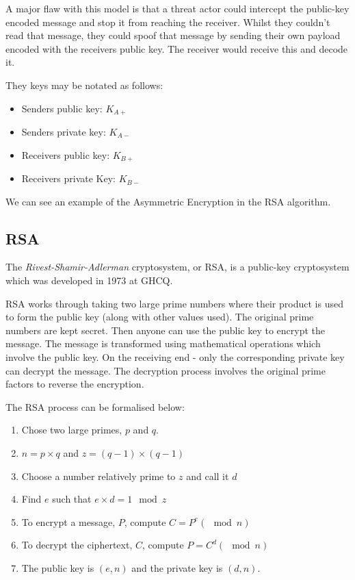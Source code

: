 A major flaw with this model is that a threat actor could intercept the public-key encoded message and stop it from reaching the receiver. Whilst they couldn't read that message, they could spoof that message by sending their own payload encoded with the receivers public key. The receiver would receive this and decode it. 

They keys may be notated as follows:
\begin{itemize}
    \item Senders public key: $K_{A+}$
    \item Senders private key: $K_{A-}$
    \item Receivers public key: $K_{B+}$
    \item Receivers private Key: $K_{B-}$
\end{itemize}

We can see an example of the Asymmetric Encryption in the RSA algorithm. 

\subsection{RSA}
The \textit{Rivest-Shamir-Adlerman} cryptosystem, or RSA, is a public-key cryptosystem which was developed in 1973 at GHCQ. 

RSA works through taking two large prime numbers where their product is used to form the public key (along with other values used). The original prime numbers are kept secret. Then anyone can use the public key to encrypt the message. The message is transformed using mathematical operations which involve the public key. On the receiving end - only the corresponding private key can decrypt the message. The decryption process involves the original prime factors to reverse the encryption.

The RSA process can be formalised below:
\begin{enumerate}
    \item Chose two large primes, $p$ and $q$.
    \item $n=p\times q$ and $z=(q-1) \times (q-1)$
    \item Choose a number relatively prime to $z$ and call it $d$
    \item Find $e$ such that $e \times d = 1 \mod z$
    \item To encrypt a message, $P$, compute $C=P^e(\mod n)$
    \item To decrypt the ciphertext, $C$, compute $P=C^d(\mod n)$
    \item The public key is $(e, n)$ and the private key is $(d, n)$.
\end{enumerate}

